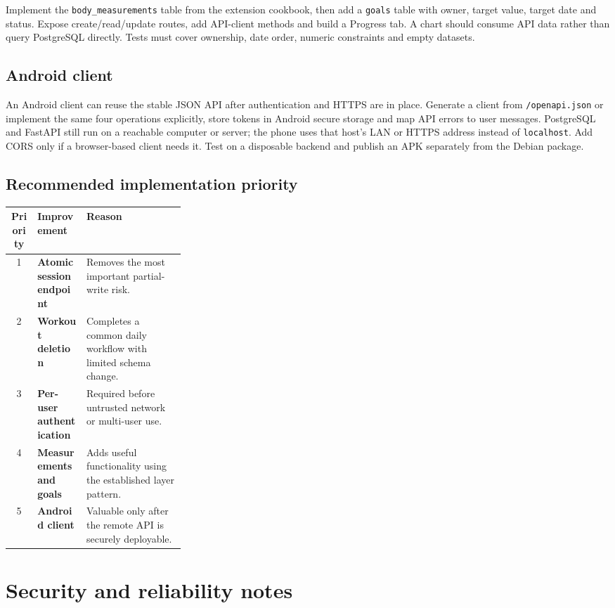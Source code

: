 \documentclass[11pt,a4paper]{article}
\begin{document}
Implement the \texttt{body\_measurements} table from the extension cookbook,
then add a \texttt{goals} table with owner, target value, target date and status.
Expose create/read/update routes, add API-client methods and build a Progress
tab. A chart should consume API data rather than query PostgreSQL directly.
Tests must cover ownership, date order, numeric constraints and empty datasets.

\subsection{Android client}

An Android client can reuse the stable JSON API after authentication and HTTPS
are in place. Generate a client from \texttt{/openapi.json} or implement the
same four operations explicitly, store tokens in Android secure storage and
map API errors to user messages. PostgreSQL and FastAPI still run on a reachable
computer or server; the phone uses that host's LAN or HTTPS address instead of
\texttt{localhost}. Add CORS only if a browser-based client needs it. Test on a
disposable backend and publish an APK separately from the Debian package.

\subsection{Recommended implementation priority}

\begin{center}
\small
\begin{tabularx}{\linewidth}{@{}c >{\bfseries}p{0.29\linewidth} X@{}}
\toprule
Priority & Improvement & Reason \\
\midrule
1 & Atomic session endpoint & Removes the most important partial-write risk. \\
2 & Workout deletion & Completes a common daily workflow with limited schema change. \\
3 & Per-user authentication & Required before untrusted network or multi-user use. \\
4 & Measurements and goals & Adds useful functionality using the established layer pattern. \\
5 & Android client & Valuable only after the remote API is securely deployable. \\
\bottomrule
\end{tabularx}
\end{center}

\section{Security and reliability notes}
\end{document}
